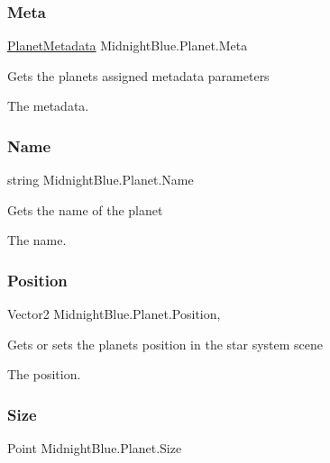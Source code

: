 \subsubsection{\texorpdfstring{Meta}{Meta}}
{\footnotesize\ttfamily \hyperlink{class_midnight_blue_1_1_planet_metadata}{Planet\+Metadata} Midnight\+Blue.\+Planet.\+Meta\hspace{0.3cm}{\ttfamily [get]}}



Gets the planets assigned metadata parameters 

The metadata.\hypertarget{class_midnight_blue_1_1_planet_aafbf18faf5aea56097d4f20d6b166d8a}{}\label{class_midnight_blue_1_1_planet_aafbf18faf5aea56097d4f20d6b166d8a} 
\subsubsection{\texorpdfstring{Name}{Name}}
{\footnotesize\ttfamily string Midnight\+Blue.\+Planet.\+Name\hspace{0.3cm}{\ttfamily [get]}}



Gets the name of the planet 

The name.\hypertarget{class_midnight_blue_1_1_planet_a1ca1fc407e47136abb5b633e11cb8d51}{}\label{class_midnight_blue_1_1_planet_a1ca1fc407e47136abb5b633e11cb8d51} 
\subsubsection{\texorpdfstring{Position}{Position}}
{\footnotesize\ttfamily Vector2 Midnight\+Blue.\+Planet.\+Position\hspace{0.3cm}{\ttfamily [get]}, {\ttfamily [set]}}



Gets or sets the planets position in the star system scene 

The position.\hypertarget{class_midnight_blue_1_1_planet_a10c69ed4de9c28b2e61848e3bb89c377}{}\label{class_midnight_blue_1_1_planet_a10c69ed4de9c28b2e61848e3bb89c377} 
\subsubsection{\texorpdfstring{Size}{Size}}
{\footnotesize\ttfamily Point Midnight\+Blue.\+Planet.\+Size\hspace{0.3cm}{\ttfamily [get]}}



